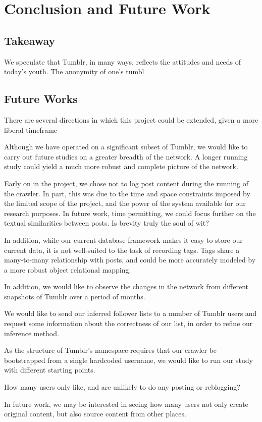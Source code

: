 \section{Conclusion and Future Work}
\label{sec:-conc}
\subsection{Takeaway}
We speculate that Tumblr, in many ways, reflects the attitudes and 
needs of today's youth.  The anonymity of one's tumbl

\subsection{Future Works}
There are several directions in which this project could be extended, 
given a more liberal timeframe


Although we have operated on a significant subset of Tumblr, we
would like to carry out future studies on a greater breadth of the 
network.  A longer running study could yield a much more robust and 
complete picture of the network.

Early on in the project, we chose not to log post content during the 
running of the crawler.  In part, this was due to the time and space 
constraints imposed by the limited scope of the project, and the power 
of the system available for our research purposes.  In future work, 
time permitting, we could focus further on the textual similarities 
between posts.  Is brevity truly the soul of wit?

In addition, while our current database framework makes it easy to store 
our current data, it is not well-suited to the task of recording tags.  
Tags share a many-to-many relationship with posts, and could be more 
accurately modeled by a more robust object relational mapping.


In addition, we would like to observe the changes in the network from 
different snapshots of Tumblr over a period of months.

We would like to send our inferred follower lists to a number of 
Tumblr users and request some information about the correctness of our 
list, in order to refine our inference method.

As the structure of Tumblr's namespace requires that our crawler be 
bootstrapped from a single hardcoded username, we would like to run our 
study with different starting points.

How many users only like, and are unlikely to do any posting or reblogging?

In future work, we may be interested in seeing how many users not only 
create original content, but also source content from other places.

